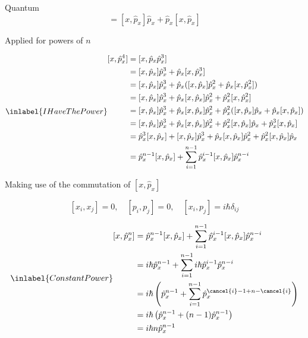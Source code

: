 \begin{answer}
\begin{answerpart}{Quantum}
    \begin{equation}
      [x,\hat{p}_x\hat{p}_x] = [x,\hat{p}_x]\hat{p}_x + \hat{p}_x[x,\hat{p}_x]
    \end{equation}

    Applied for powers of $n$

    \begin{equation}
      \inlabel{IHaveThePower}
      \begin{split}
        [x,\hat{p}_x^4]
        &= [x,\hat{p}_x\hat{p}_x^{3}]\\
        &= [x,\hat{p}_x]\hat{p}_x^{3} + \hat{p}_x[x,\hat{p}_x^{3}]\\
        &= [x,\hat{p}_x]\hat{p}_x^{3} + \hat{p}_x([x,\hat{p}_x]\hat{p}_x^{2} + \hat{p}_x[x,\hat{p}_x^{2}])\\
        &= [x,\hat{p}_x]\hat{p}_x^{3} + \hat{p}_x[x,\hat{p}_x]\hat{p}_x^{2} + \hat{p}_x^2[x,\hat{p}_x^{2}]\\
        &= [x,\hat{p}_x]\hat{p}_x^{3} + \hat{p}_x[x,\hat{p}_x]\hat{p}_x^{2} + \hat{p}_x^2([x,\hat{p}_x]\hat{p}_x + \hat{p}_x[x,\hat{p}_x])\\
        &= [x,\hat{p}_x]\hat{p}_x^{3} + \hat{p}_x[x,\hat{p}_x]\hat{p}_x^{2} + \hat{p}_x^2[x,\hat{p}_x]\hat{p}_x + \hat{p}_x^3[x,\hat{p}_x]\\
        &= \hat{p}_x^3[x,\hat{p}_x] + [x,\hat{p}_x]\hat{p}_x^{3} + \hat{p}_x[x,\hat{p}_x]\hat{p}_x^{2} + \hat{p}_x^2[x,\hat{p}_x]\hat{p}_x\\
        &= \hat{p}_x^{n-1}[x,\hat{p}_x] + \sum_{i=1}^{n-1}\hat{p}_x^{i-1}[x,\hat{p}_x]\hat{p}_x^{n-i}
      \end{split}
    \end{equation}

    Making use of the commutation of $[x,\hat{p}_x]$

    \begin{equation}
      \tag{1.228}
      [x_i,x_j] = 0,\quad[p_i,p_j] = 0,\quad[x_i,p_j] = i\hbar\delta_{ij}
    \end{equation}

    \begin{equation}
      \inlabel{ConstantPower}
      \begin{split}
        [x,\hat{p}_x^n]
        &= \hat{p}_x^{n-1}[x,\hat{p}_x] + \sum_{i=1}^{n-1}\hat{p}_x^{i-1}[x,\hat{p}_x]\hat{p}_x^{n-i}\\
        &= i\hbar \hat{p}_x^{n-1} + \sum_{i=1}^{n-1}i\hbar \hat{p}_x^{i-1}\hat{p}_x^{n-i}\\
        &= i\hbar
        \left(
        \hat{p}_x^{n-1} + \sum_{i=1}^{n-1} \hat{p}_x^{\cancel{i} - 1 + n - \cancel{i}}
        \right)
        \\
        &= i\hbar
        \left(
        \hat{p}_x^{n-1} + (n-1)\hat{p}_x^{n-1}
        \right)
        \\
        &= i \hbar n\hat{p}_x^{n-1}
      \end{split}
    \end{equation}


\end{answerpart}
\end{answer}
